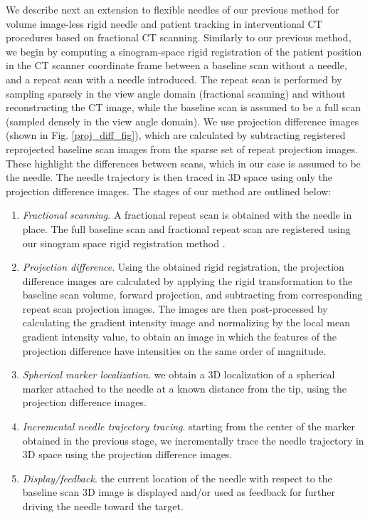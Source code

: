 We describe next an extension to flexible needles of our previous method \cite{medan2017reduced} for volume image-less rigid needle and patient tracking in interventional CT procedures based on fractional CT scanning. Similarly to our previous method, we begin by computing a sinogram-space rigid registration of the patient position in the CT scanner coordinate frame between a baseline scan without a needle, and a repeat scan with a needle introduced. The repeat scan is performed by sampling sparsely in the view angle domain (fractional scanning) and without reconstructing the CT image, while the baseline scan is assumed to be a full scan (sampled densely in the view angle domain). We use projection difference images (shown in Fig. \ref{proj_diff_fig}), which are calculated by subtracting registered reprojected baseline scan images from the sparse set of repeat projection images. These highlight the differences between scans, which in our case is assumed to be the needle. The needle trajectory is then traced in 3D space using only the projection difference images. The stages of our method are outlined below:
\begin{enumerate}
\item \textit{Fractional scanning}. A fractional repeat scan is obtained with the needle in place. The full baseline scan and fractional repeat scan are registered using our sinogram space rigid registration method \cite{medan2017sparse}.
\item \textit{Projection difference}. Using the obtained rigid registration, the projection difference images are calculated by applying the rigid transformation to the baseline scan volume, forward projection, and subtracting from corresponding repeat scan projection images. The images are then post-processed by calculating the gradient intensity image and normalizing by the local mean gradient intensity value, to obtain an image in which the features of the projection difference have intensities on the same order of magnitude.
\item \textit{Spherical marker localization}. we obtain a 3D localization of a spherical marker attached to the needle at a known distance from the tip, using the projection difference images.
\item \textit{Incremental needle trajectory tracing}. starting from the center of the marker obtained in the previous stage, we incrementally trace the needle trajectory in 3D space using the projection difference images.
\item \textit{Display/feedback}. the current location of the needle with respect to the baseline scan 3D image is displayed and/or used as feedback for further driving the needle toward the target.
\end{enumerate}
